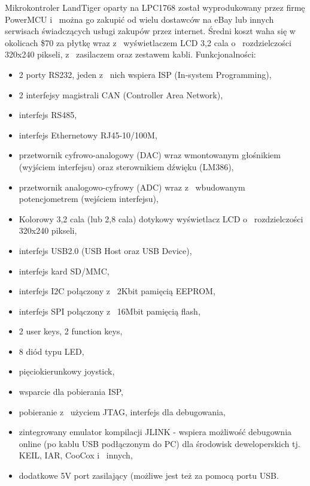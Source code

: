 \documentclass{BscUS}
\begin{document}
Mikrokontroler LandTiger oparty na LPC1768 został wyprodukowany przez firmę PowerMCU i~ można go zakupić od wielu dostawców na eBay lub innych serwisach świadczących usługi zakupów przez internet. Średni koszt waha się w~ okolicach \$70 za płytkę wraz z~ wyświetlaczem LCD 3,2 cala o~ rozdzielczości 320x240 pikseli, z~ zasilaczem oraz zestawem kabli. \cite{landtigerDesc}
\newline
Funkcjonalności:
\begin{itemize} %
\item 2 porty RS232, jeden z~ nich wspiera ISP (In-system Programming),
\item 2 interfejsy magistrali CAN (Controller Area Network),
\item interfejs RS485,
\item interfejs Ethernetowy RJ45-10/100M,
\item przetwornik cyfrowo-analogowy (DAC) wraz wmontowanym głośnikiem (wyjściem interfejsu) oraz sterownikiem dźwięku (LM386),
\item przetwornik analogowo-cyfrowy (ADC) wraz z~ wbudowanym potencjometrem (wejściem interfejsu),
\item Kolorowy 3,2 cala (lub 2,8 cala) dotykowy wyświetlacz LCD o~ rozdzielczości 320x240 pikseli,
\item interfejs USB2.0 (USB Host oraz USB Device),
\item interfejs kard SD/MMC,
\item interfejs I2C połączony z~ 2Kbit pamięcią EEPROM,
\item interfejs SPI połączony z~ 16Mbit pamięcią flash,
\item 2 user keys, 2 function keys,
\item 8 diód typu LED,
\item pięciokierunkowy joystick,
\item wsparcie dla pobierania ISP,
\item pobieranie z~ użyciem JTAG, interfejs dla debugowania,
\item zintegrowany emulator kompilacji JLINK - wspiera możliwość debugownia online (po kablu USB podłączonym do PC) dla środowisk deweloperskich tj. KEIL, IAR, CooCox i~ innych,
\item dodatkowe 5V port zasilający (możliwe jest też za pomocą portu USB.
\end{itemize}
\end{document}
